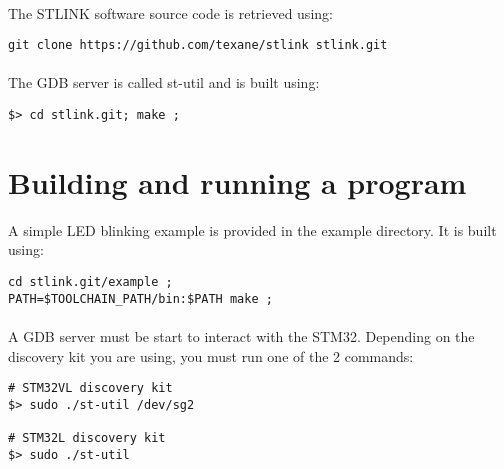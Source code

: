 \documentclass[a4paper, 11pt]{article}
\begin{document}
\paragraph{}
The STLINK software source code is retrieved using:\\
\begin{small}
\begin{lstlisting}[frame=tb]
git clone https://github.com/texane/stlink stlink.git
\end{lstlisting}
\end{small}

\paragraph{}
The GDB server is called st-util and is built using:\\
\begin{small}
\begin{lstlisting}[frame=tb]
$> cd stlink.git; make ;
\end{lstlisting}
\end{small}


\newpage

\section{Building and running a program}
A simple LED blinking example is provided in the example directory. It is built using:\\
\begin{small}
\begin{lstlisting}[frame=tb]
cd stlink.git/example ;
PATH=$TOOLCHAIN_PATH/bin:$PATH make ;
\end{lstlisting}
\end{small}

\paragraph{}
A GDB server must be start to interact with the STM32.
Depending on the discovery kit you are using, you must
run one of the 2 commands:\\
\begin{small}
\begin{lstlisting}[frame=tb]
# STM32VL discovery kit
$> sudo ./st-util /dev/sg2

# STM32L discovery kit
$> sudo ./st-util
\end{lstlisting}
\end{small}
\end{document}
